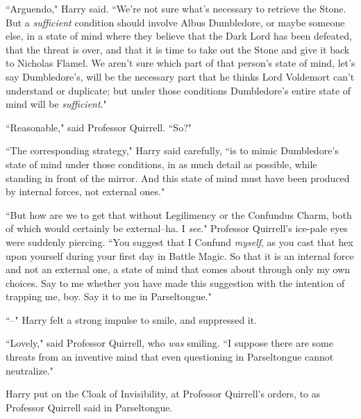 ``Arguendo," Harry said. ``We're not sure what's necessary to retrieve the Stone. But a \emph{sufficient} condition should involve Albus Dumbledore, or maybe someone else, in a state of mind where they believe that the Dark Lord has been defeated, that the threat is over, and that it is time to take out the Stone and give it back to Nicholas Flamel. We aren't sure which part of that person's state of mind, let's say Dumbledore's, will be the necessary part that he thinks Lord Voldemort can't understand or duplicate; but under those conditions Dumbledore's entire state of mind will be \emph{sufficient}."

``Reasonable," said Professor Quirrell. ``So?"

``The corresponding strategy," Harry said carefully, ``is to mimic Dumbledore's state of mind under those conditions, in as much detail as possible, while standing in front of the mirror. And this state of mind must have been produced by internal forces, not external ones."

``But how are we to get that without Legilimency or the Confundus Charm, both of which would certainly be external\---ha. I \emph{see}." Professor Quirrell's ice-pale eyes were suddenly piercing. ``You suggest that I Confund \emph{myself}, as you cast that hex upon yourself during your first day in Battle Magic. So that it is an internal force and not an external one, a state of mind that comes about through only my own choices. Say to me whether you have made this suggestion with the intention of trapping me, boy. Say it to me in Parseltongue."

``\---" Harry felt a strong impulse to smile, and suppressed it.

``Lovely," said Professor Quirrell, who \emph{was} smiling. ``I suppose there are some threats from an inventive mind that even questioning in Parseltongue cannot neutralize."

\later

Harry put on the Cloak of Invisibility, at Professor Quirrell's orders, to  as Professor Quirrell said in Parseltongue.

